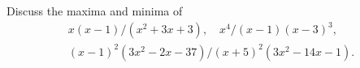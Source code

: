 Discuss the maxima and minima of
\begin{gather*}
x(x - 1)/(x^{2} + 3x + 3),\quad x^{4}/(x - 1)(x - 3)^{3},\\
(x - 1)^{2}(3x^{2} - 2x - 37)/(x + 5)^{2}(3x^{2} - 14x - 1).
\end{gather*}

